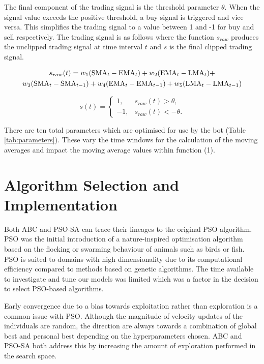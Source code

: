 \documentclass[a4paper, 12pt]{extarticle}
\begin{document}
\newpage
The final component of the trading signal is the threshold parameter $\theta$. When the signal value exceeds the positive threshold, a buy signal is triggered and vice versa. This simplifies the trading signal to a value between 1 and -1 for buy and sell respectively. The trading signal is as follows where the function $s_{raw}$ produces the unclipped trading signal at time interval $t$ and $s$ is the final clipped trading signal.

\begin{multline}
    $$ s_{raw}(t) = w_1(\text{SMA}_{t} - \text{EMA}_{t}) + w_2(\text{EMA}_{t} - \text{LMA}_{t}) + \\
    w_3(\text{SMA}_t - \text{SMA}_{t - 1}) + w_4(\text{EMA}_t - \text{EMA}_{t - 1}) + w_5(\text{LMA}_t - \text{LMA}_{t - 1}) $$
\end{multline}

\begin{equation}
s(t) = 
\begin{cases}
1,      & s_{raw}(t) > \theta,\\
-1,     & s_{raw}(t) < -\theta.
\end{cases}
\end{equation}

There are ten total parameters which are optimised for use by the bot (Table \ref{tab:parameters}). These vary the time windows for the calculation of the moving averages and impact the moving average values within function (1).

\section{Algorithm Selection and Implementation}
Both ABC and PSO-SA can trace their lineages to the original PSO algorithm. PSO was the initial introduction of a nature-inspired optimisation algorithm based on the flocking or swarming behaviour of animals such as birds or fish. PSO is suited to domains with high dimensionality due to its computational efficiency compared to methods based on genetic algorithms. The time available to investigate and tune our models was limited which was a factor in the decision to select PSO-based algorithms. 

Early convergence due to a bias towards exploitation rather than exploration is a common issue with PSO. Although the magnitude of velocity updates of the individuals are random, the direction are always towards a combination of global best and personal best depending on the hyperparameters chosen. ABC and PSO-SA both address this by increasing the amount of exploration performed in the search space. 
\end{document}
